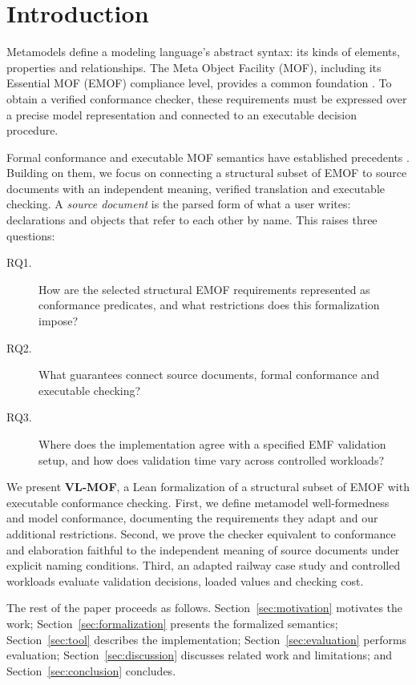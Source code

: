 \section{Introduction}\label{sec:introduction}
Metamodels define a modeling language's abstract syntax: its kinds of elements,
properties and relationships. The Meta Object Facility (MOF), including its
Essential MOF (EMOF) compliance level, provides a common foundation
\cite{omg_mof_251}. To obtain a verified conformance checker, these requirements
must be expressed over a precise model representation and connected to an
executable decision procedure.

Formal conformance and executable MOF semantics have established precedents
\cite{boronat_meseguer_2010,paige_brooke_ostroff_2007}. Building on them, we focus
on connecting a structural subset of EMOF to source documents with an
independent meaning, verified translation and executable checking. A
\emph{source document} is the parsed form of what a user writes: declarations
and objects that refer to each other by name. This raises three questions:
\begin{description}
\item[RQ1.] How are the selected structural EMOF requirements represented as
conformance predicates, and what restrictions does this formalization impose?
\item[RQ2.] What guarantees connect source documents, formal conformance
and executable checking?
\item[RQ3.] Where does the implementation agree with a specified EMF validation
setup, and how does validation time vary across controlled workloads?
\end{description}

We present \textbf{VL-MOF}, a Lean \cite{demoura_ullrich_2021} formalization of
a structural subset of EMOF with executable conformance checking. First, we
define metamodel well-formedness and model conformance, documenting the
requirements they adapt and our additional restrictions. Second, we prove the
checker equivalent to conformance and elaboration faithful to the independent
meaning of source documents under explicit naming conditions. Third, an adapted
railway case study and controlled workloads evaluate validation decisions,
loaded values and checking cost.

The rest of the paper proceeds as follows. Section~\ref{sec:motivation}
motivates the work; Section~\ref{sec:formalization} presents the formalized
semantics; Section~\ref{sec:tool} describes the implementation;
Section~\ref{sec:evaluation} performs evaluation; Section~\ref{sec:discussion}
discusses related work and limitations; and Section~\ref{sec:conclusion}
concludes.
